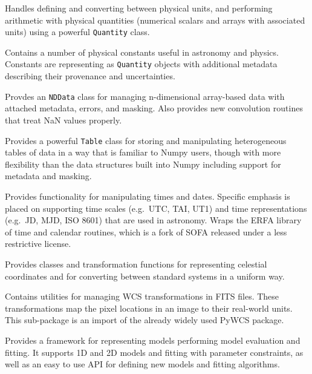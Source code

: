 \documentclass[11pt,twoside]{article}
\begin{document}
Handles defining and converting between physical units, and performing
arithmetic with physical quantities (numerical scalars and arrays with
associated units) using a powerful \texttt{Quantity} class.


Contains a number of physical constants useful in astronomy and physics.
Constants are representing as \texttt{Quantity} objects with additional
metadata describing their provenance and uncertainties.


Provdes an \texttt{NDData} class for managing n-dimensional array-based data
with attached metadata, errors, and masking.  Also provides new convolution
routines that treat NaN values properly.


Provides a powerful \texttt{Table} class for storing and manipulating
heterogeneous tables of data in a way that is familiar to Numpy users, though
with more flexibility than the data structures built into Numpy including
support for metadata and masking.

Provides functionality for manipulating times and dates.  Specific emphasis is
placed on supporting time scales (e.g.~UTC, TAI, UT1) and time representations
(e.g.~JD, MJD, ISO 8601) that are used in astronomy.  Wraps the ERFA library of
time and calendar routines, which is a fork of SOFA released under a less
restrictive license.


Provides classes and transformation functions for representing celestial
coordinates and for converting between standard systems in a uniform way.


Contains utilities for managing WCS transformations in FITS files.  These
transformations map the pixel locations in an image to their real-world units.
This sub-package is an import of the already widely used PyWCS package.


Provides a framework for representing models performing model evaluation and
fitting.  It supports 1D and 2D models and fitting with parameter constraints,
as well as an easy to use API for defining new models and fitting algorithms.
\end{document}
